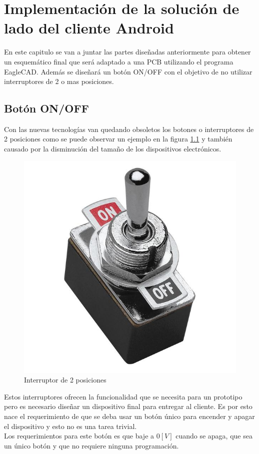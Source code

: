\chapter{Implementación de la solución de lado del cliente Android}\label{servicios}
En este capitulo se van a juntar las partes diseñadas anteriormente para obtener un esquemático final que será adaptado a una PCB utilizando el programa EagleCAD. Además se diseñará un botón ON/OFF con el objetivo de no utilizar interruptores de 2 o mas posiciones.
\section{Botón ON/OFF}
Con las nuevas tecnologías van quedando obsoletos los botones o interruptores de 2 posiciones como se puede observar un ejemplo en la figura \ref{toggle} y también causado por la disminución del tamaño de los dispositivos electrónicos. 

\begin{figure}[H]
\centering
\includegraphics[scale=0.15]{figuras/eagle/toggle.png}
\caption{Interruptor de 2 posiciones}
\label{toggle}
\end{figure}

Estos interruptores ofrecen la funcionalidad que se necesita para un prototipo pero es necesario diseñar un dispositivo final para entregar al cliente. Es por esto nace el requerimiento de que se deba usar un botón único para encender y apagar el dispositivo y esto no es una tarea trivial.\\
	Los requerimientos para este botón es que baje a $0[V]$ cuando se apaga, que sea un único botón y que no requiere ninguna programación. \\

